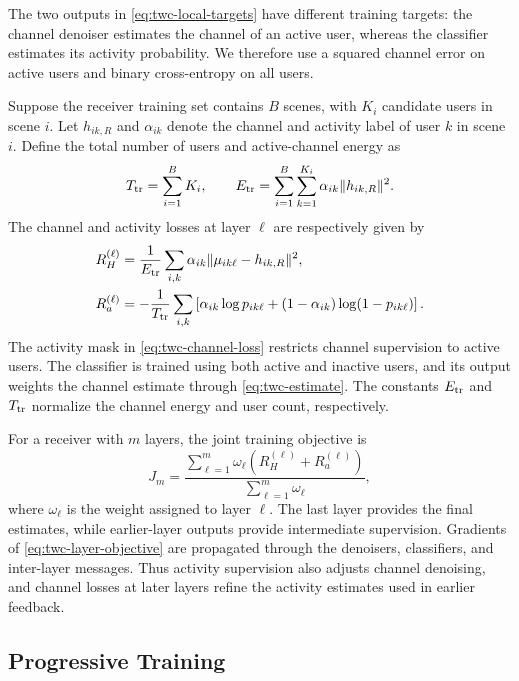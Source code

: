 The two outputs in \eqref{eq:twc-local-targets} have different training
targets: the channel denoiser estimates the channel of an active user,
whereas the classifier estimates its activity probability.
We therefore use a squared channel error on active users and binary
cross-entropy on all users.

Suppose the receiver training set contains $B$ scenes, with $K_i$
candidate users in scene $i$. Let $h_{ik,R}$ and $\alpha_{ik}$
denote the channel and activity label of user $k$ in scene $i$.
Define the total number of users and active-channel energy as
\begin{equation}
 T_{\rm tr}=\sum_{i=1}^{B}K_i,\qquad
 E_{\rm tr}=\sum_{i=1}^{B}\sum_{k=1}^{K_i}
               \alpha_{ik}\|h_{ik,R}\|^2.
 \label{eq:twc-training-statistics}
\end{equation}
The channel and activity losses at layer $\ell$ are respectively
given by
\begin{align}
 R_H^{(\ell)}&=\frac{1}{E_{\rm tr}}\sum_{i,k}
       \alpha_{ik}\|\mu_{ik\ell}-h_{ik,R}\|^2,
 \label{eq:twc-channel-loss}\\
 R_a^{(\ell)}&=-\frac{1}{T_{\rm tr}}\sum_{i,k}
       \left[\alpha_{ik}\log p_{ik\ell}
       +(1-\alpha_{ik})\log(1-p_{ik\ell})\right].
 \label{eq:twc-activity-loss}
\end{align}
The activity mask in \eqref{eq:twc-channel-loss} restricts channel
supervision to active users. The classifier is trained using both
active and inactive users, and its output weights the channel estimate
through \eqref{eq:twc-estimate}. The constants $E_{\rm tr}$ and
$T_{\rm tr}$ normalize the channel energy and user count, respectively.

For a receiver with $m$ layers, the joint training objective is
\begin{equation}
 J_m=\frac{\sum_{\ell=1}^{m}\omega_\ell
                  \left(R_H^{(\ell)}+R_a^{(\ell)}\right)}
                 {\sum_{\ell=1}^{m}\omega_\ell},
 \label{eq:twc-layer-objective}
\end{equation}
where $\omega_\ell$ is the weight assigned to layer $\ell$.
The last layer provides the final estimates, while earlier-layer
outputs provide intermediate supervision.
Gradients of \eqref{eq:twc-layer-objective} are propagated through
the denoisers, classifiers, and inter-layer messages. Thus activity
supervision also adjusts channel denoising, and channel losses at later
layers refine the activity estimates used in earlier feedback.

\subsection{Progressive Training}

